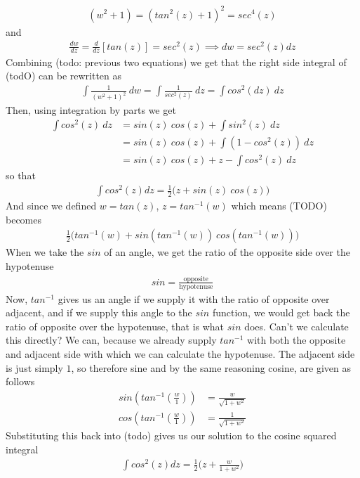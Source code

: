 \documentclass{article}
\begin{document}
\begin{align}
    (w^2 + 1) = (tan^2(z) + 1)^2 = sec^4(z)
\end{align}
and
\begin{align}
    \frac{dw}{dz} = \frac{d}{dz}[tan(z)] = sec^2(z) \implies dw = sec^2(z)dz
\end{align} 
Combining (todo: previous two equations) we get that the right side integral of (todO) can be rewritten as
\begin{align}
    \int \frac{1}{(w^2 + 1)^2} ~ dw = \int \frac{1}{sec^2(z)}~dz = \int{cos^2(dz)}~dz
\end{align}
Then, using integration by parts we get 
\begin{align}
     \int cos^2(z) ~ dz &= sin(z)~cos(z) + \int sin^2(z) ~dz\\
    &= sin(z)~cos(z) + \int (1 - cos^2(z)) ~dz \\
    &= sin(z)~cos(z) + z - \int cos^2(z)~dz
\end{align}
so that
\begin{align}
    \int cos^2(z) dz = \frac{1}{2} \bigl(z + sin(z)~cos(z)\bigr)
\end{align}
And since we defined $w = tan(z)$, $z = tan^{-1}(w)$ which means (TODO) becomes
\begin{align}
    \frac{1}{2} \bigl(  tan^{-1}(w) + sin( tan^{-1}(w))~cos( tan^{-1}(w)) \bigr)
\end{align}
When we take the $sin$ of an angle, we get the ratio of the opposite side over the hypotenuse
\begin{align}
    sin = \frac{\text{opposite}}{\text{hypotenuse}}
\end{align}
Now, $tan^{-1}$ gives us an angle if we supply it with the ratio of opposite over adjacent, and if we supply this angle to the $sin$ function, we would get back the ratio of opposite over the hypotenuse, that is what $sin$ does. Can't we calculate this directly? We can, because we already supply $tan^{-1}$ with both the opposite and adjacent side with which we can calculate the hypotenuse. The adjacent side is just simply $1$, so therefore sine and by the same reasoning cosine, are given as follows
\begin{align}
    sin(tan^{-1}(\frac{w}{1})) &= \frac{w}{\sqrt{1 + w^2}} \\
    cos(tan^{-1}(\frac{w}{1})) &= \frac{1}{\sqrt{1 + w^2}}
\end{align}
Substituting this back into (todo) gives us our solution to the cosine squared integral
\begin{align}
    \int cos^2(z) dz = \frac{1}{2} \bigl(z + \frac{w}{1+w^2}\bigr)
\end{align}
\end{document}
